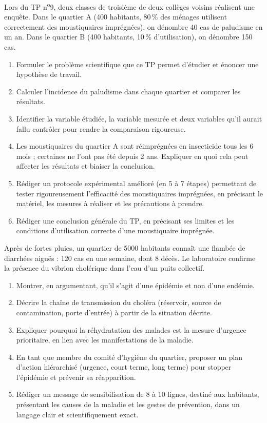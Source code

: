 \documentclass[11pt]{article}
\begin{document}
\begin{exercice}
Lors du TP n\textsuperscript{o}9, deux classes de troisième de deux collèges voisins réalisent une enquête. Dans le quartier A (\num{400} habitants, \num{80}\,\% des ménages utilisent correctement des moustiquaires imprégnées), on dénombre \num{40} cas de paludisme en un an. Dans le quartier B (\num{400} habitants, \num{10}\,\% d'utilisation), on dénombre \num{150} cas.
\begin{enumerate}
\item Formuler le problème scientifique que ce TP permet d'étudier et énoncer une hypothèse de travail.
\item Calculer l'incidence du paludisme dans chaque quartier et comparer les résultats.
\item Identifier la variable étudiée, la variable mesurée et deux variables qu'il aurait fallu contrôler pour rendre la comparaison rigoureuse.
\item Les moustiquaires du quartier A sont réimprégnées en insecticide tous les 6 mois ; certaines ne l'ont pas été depuis 2 ans. Expliquer en quoi cela peut affecter les résultats et biaiser la conclusion.
\item Rédiger un protocole expérimental amélioré (en 5 à 7 étapes) permettant de tester rigoureusement l'efficacité des moustiquaires imprégnées, en précisant le matériel, les mesures à réaliser et les précautions à prendre.
\item Rédiger une conclusion générale du TP, en précisant ses limites et les conditions d'utilisation correcte d'une moustiquaire imprégnée.
\end{enumerate}
\end{exercice}

\begin{exercice}
Après de fortes pluies, un quartier de \num{5000} habitants connaît une flambée de diarrhées aiguës : \num{120} cas en une semaine, dont \num{8} décès. Le laboratoire confirme la présence du vibrion cholérique dans l'eau d'un puits collectif.
\begin{enumerate}
\item Montrer, en argumentant, qu'il s'agit d'une épidémie et non d'une endémie.
\item Décrire la chaîne de transmission du choléra (réservoir, source de contamination, porte d'entrée) à partir de la situation décrite.
\item Expliquer pourquoi la réhydratation des malades est la mesure d'urgence prioritaire, en lien avec les manifestations de la maladie.
\item En tant que membre du comité d'hygiène du quartier, proposer un plan d'action hiérarchisé (urgence, court terme, long terme) pour stopper l'épidémie et prévenir sa réapparition.
\item Rédiger un message de sensibilisation de 8 à 10 lignes, destiné aux habitants, présentant les causes de la maladie et les gestes de prévention, dans un langage clair et scientifiquement exact.
\end{enumerate}
\end{exercice}
\end{document}

